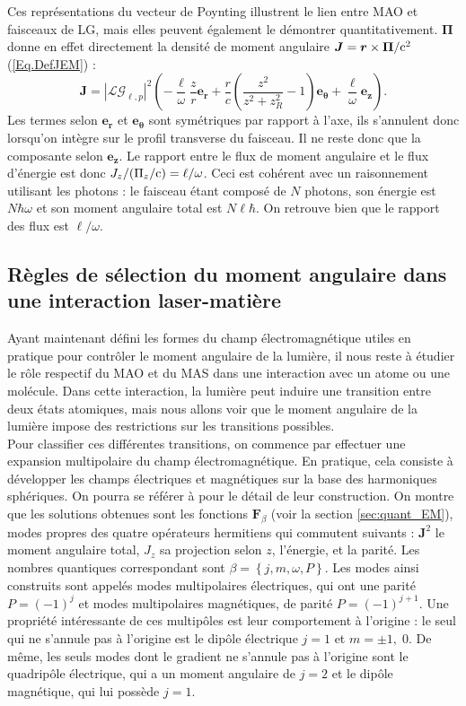 Ces représentations du vecteur de Poynting illustrent le lien entre MAO et faisceaux de LG, mais elles peuvent également le démontrer quantitativement. $\bm{\Pi}$ donne en effet directement la densité de moment angulaire $\bm{J} = \bm{r}\times\bm{\Pi}/\mathrm{c}^2$ (\ref{Eq.DefJEM}) :
\begin{equation*}
\bm{J} = \left|\mathcal{LG}_{\ell,p}\right|^2\left(-\frac{\ell}{\omega}\frac{z}{r}\bm{e_r}+\frac{r}{c}\left(\frac{z^2}{z^2+z_R^2} -1\right)\bm{e_\theta}+\frac{\ell}{\omega}\bm{e_z}\right).
\end{equation*}
Les termes selon $\bm{e_r}$ et $\bm{e_\theta}$ sont symétriques par rapport à l'axe, ils s'annulent donc lorsqu'on intègre sur le profil transverse du faisceau. Il ne reste donc que la composante selon $\bm{e_z}$. Le rapport entre le flux de moment angulaire et le flux d'énergie est donc $J_z/(\Pi_z/\mathrm{c}) = \ell/\omega$. Ceci est cohérent avec un raisonnement utilisant les photons : le faisceau étant composé de $N$ photons, son énergie est $N\hbar\omega$ et son moment angulaire total est $N\ell\hbar$. On retrouve bien que le rapport des flux est $\ell/\omega$.

\subsection{Règles de sélection du moment angulaire dans une interaction laser-matière}
\label{sec:selectionrules}
Ayant maintenant défini les formes du champ électromagnétique utiles en pratique pour contrôler le moment angulaire de la lumière, il nous reste à étudier le rôle respectif du MAO et du MAS dans une interaction avec un atome ou une molécule. Dans cette interaction, la lumière peut induire une transition entre deux états atomiques, mais nous allons voir que le moment angulaire de la lumière impose des restrictions sur les transitions possibles.\\
Pour classifier ces différentes transitions, on commence par effectuer une expansion multipolaire du champ électromagnétique. En pratique, cela consiste à développer les champs électriques et magnétiques sur la base des harmoniques sphériques. On pourra se référer à  pour le détail de leur construction. On montre que les solutions obtenues sont les fonctions $\bm{F}_\beta$ (voir la section \ref{sec:quant_EM}), modes propres des quatre opérateurs hermitiens qui commutent suivants : $\bm{J}^2$ le moment angulaire total, $J_z$ sa projection selon $z$, l'énergie, et la parité. Les nombres quantiques correspondant sont $\beta=\left\{j,m,\omega,P\right\}$. Les modes ainsi construits sont appelés modes multipolaires électriques, qui ont une parité $P=(-1)^j$ et modes multipolaires magnétiques, de parité $P=(-1)^{j+1}$. Une propriété intéressante de ces multipôles est leur comportement à l'origine : le seul qui ne s'annule pas à l'origine est le dipôle électrique $j=1$ et $m=\pm1,\;0$. De même, les seuls modes dont le gradient ne s'annule pas à l'origine sont le quadripôle électrique, qui a un moment angulaire de $j=2$ et le dipôle magnétique, qui lui possède $j=1$.\par


